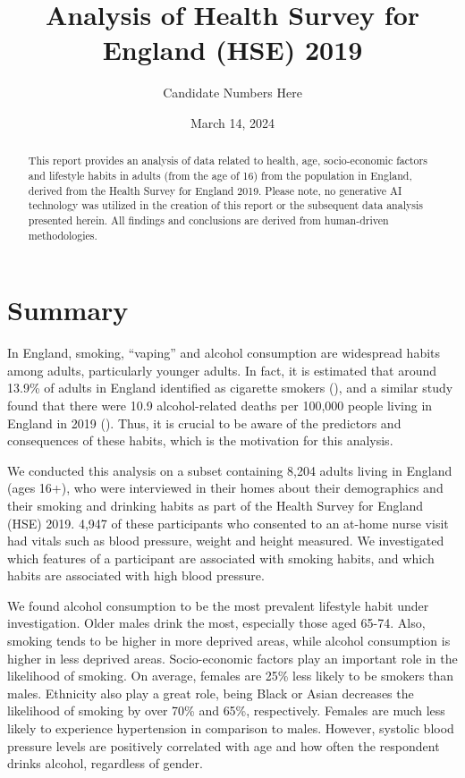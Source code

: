 \documentclass[
  11pt,
  twocolumn]{article}
\title{Analysis of Health Survey for England (HSE) 2019}
\author{Candidate Numbers Here}
\date{March 14, 2024}
\begin{document}
\maketitle
\begin{abstract}
This report provides an analysis of data related to health, age,
socio-economic factors and lifestyle habits in adults (from the age of
16) from the population in England, derived from the Health Survey for
England 2019. Please note, no generative AI technology was utilized in
the creation of this report or the subsequent data analysis presented
herein. All findings and conclusions are derived from human-driven
methodologies.
\end{abstract}


\clearpage

\section{Summary}\label{summary}

In England, smoking, ``vaping'' and alcohol consumption are widespread
habits among adults, particularly younger adults. In fact, it is
estimated that around 13.9\% of adults in England identified as
cigarette smokers (), and a similar study
found that there were 10.9 alcohol-related deaths per 100,000 people
living in England in 2019 (). Thus, it is
crucial to be aware of the predictors and consequences of these habits,
which is the motivation for this analysis.

We conducted this analysis on a subset containing 8,204 adults living in
England (ages 16+), who were interviewed in their homes about their
demographics and their smoking and drinking habits as part of the Health
Survey for England (HSE) 2019. 4,947 of these participants who consented
to an at-home nurse visit had vitals such as blood pressure, weight and
height measured. We investigated which features of a participant are
associated with smoking habits, and which habits are associated with
high blood pressure.

We found alcohol consumption to be the most prevalent lifestyle habit
under investigation. Older males drink the most, especially those aged
65-74. Also, smoking tends to be higher in more deprived areas, while
alcohol consumption is higher in less deprived areas. Socio-economic
factors play an important role in the likelihood of smoking. On average,
females are 25\% less likely to be smokers than males. Ethnicity also
play a great role, being Black or Asian decreases the likelihood of
smoking by over 70\% and 65\%, respectively. Females are much less
likely to experience hypertension in comparison to males. However,
systolic blood pressure levels are positively correlated with age and
how often the respondent drinks alcohol, regardless of gender.
\end{document}
